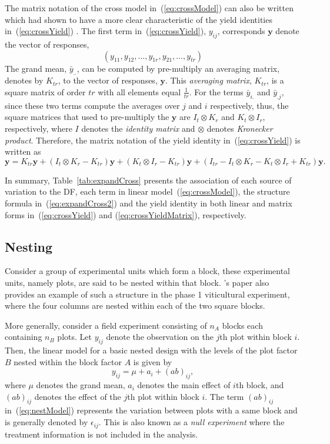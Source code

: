 \documentclass[11pt,a4paper]{article}
\begin{document}
The matrix notation of the cross model in~(\ref{eq:crossModel}) can also be written which had shown to have a more clear characteristic of the yield identities in~(\ref{eq:crossYield}) \citep{Nelder1965A}. The first term  in~(\ref{eq:crossYield}), $y_{ij}$, corresponds $\bm{y}$ denote the vector of responses,
\[
(y_{11}, y_{12}, \dots, y_{1r}, y_{21}, \dots, y_{tr}) 
\]
The grand mean, $\bar{y}_{..}$, can be computed by pre-multiply an averaging matrix, denotes by $K_{tr}$, to the vector of responses, $\bm{y}$. This \emph{averaging matrix}, $K_{tr}$, is a square matrix of order $tr$ with all elements equal $\frac{1}{tr}$. For the terms $\bar{y}_{i.}$ and $\bar{y}_{.j}$, since these two terms compute the averages over $j$ and $i$ respectively, thus, the square matrices that used to pre-multiply the $\bm{y}$ are $I_{t} \otimes K_{r}$ and $K_{t} \otimes I_{r}$, respectively, where $I$ denotes the \emph{identity matrix} and $\otimes$ denotes \emph{Kronecker product}. Therefore, the matrix notation of the yield identity in~(\ref{eq:crossYield}) is written as 
\begin{equation}\label{eq:crossYieldMatrix}
\bm{y} = K_{tr}\bm{y} + (I_{t} \otimes K_{r} - K_{tr})\bm{y} + (K_{t} \otimes I_{r} - K_{tr})\bm{y} + (I_{tr} - I_{t} \otimes K_{r} - K_{t} \otimes I_{r} + K_{tr})\bm{y}.
\end{equation}

In summary, Table~\ref{tab:expandCross} presents the association of each source of variation to the DF, each term in linear model~(\ref{eq:crossModel}), the structure formula in~(\ref{eq:expandCross2}) and the yield identity in both linear and matrix forms in~(\ref{eq:crossYield}) and (\ref{eq:crossYieldMatrix}), respectively.

\subsection{Nesting}
Consider a group of experimental units which form a block, these experimental units, namely plots, are said to be nested within that block. \citeauthor{Brien1999}'s paper also provides an example of such a structure in the phase 1 viticultural experiment, where the four columns are nested within each of the two square blocks.

More generally, consider a field experiment consisting of $n_A$ blocks each containing $n_B$ plots. Let $y_{ij}$ denote the observation on the $j$th plot within block $i$. Then, the linear model for a basic nested design with the levels of the plot factor $B$ nested within the block factor $A$ is given by
\begin{equation}\label{eq:nestModel}
y_{ij}= \mu + a_{i} + (ab)_{ij},
\end{equation}
where $\mu$ denotes the grand mean, $a_{i}$ denotes the main effect of $i$th block, and $(ab)_{ij}$ denotes the effect of the $j$th plot within block $i$. The term $(ab)_{ij}$ in~(\ref{eq:nestModel}) represents the variation between plots with a same block and is generally denoted by $\epsilon_{ij}$. This is also known as a \emph{null experiment} where the treatment information is not included in the analysis.
\end{document}
